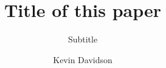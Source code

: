 \documentclass[a4paper, oneside]{scrartcl}
\begin{document}
\author{Kevin Davidson}
\subject{Subject line}
\title{Title of this paper}
\subtitle{Subtitle}

\maketitle
\end{document}

